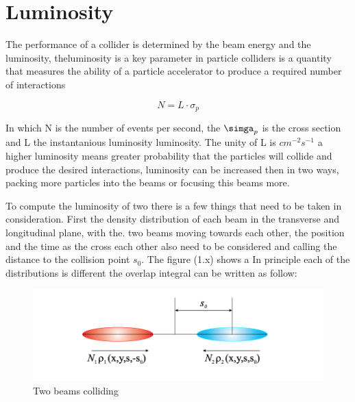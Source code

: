 

\section{Luminosity}

The performance of a collider is determined by the beam energy and the luminosity, theluminosity is a key parameter in particle colliders is a quantity that measures the ability of a particle accelerator to produce a required number of interactions\cite{Lum} 

\begin{equation}
N = L \cdot \sigma_{p} 
\end{equation}

In which N is the number of events per second, the $\simga_{p}$ is the cross section and L the instantanious luminosity luminosity. The unity of L is  $cm^{-2} s^{-1}$ a higher luminosity means greater probability that the particles will collide and produce the desired interactions, luminosity can be increased then in two ways, packing more particles into the beams or focusing this beams more.  

To compute the luminosity of two there is a few things that need to be taken in consideration. First the density distribution of each beam in the transverse and longitudinal plane, with the. two beams moving towards each other, the position and the time as the cross each other also need to be considered and calling the distance to the collision point $s_{0}$. The figure (1.x) shows a  In principle each of the distributions is different the overlap integral can be written as follow:


\begin{figure}[h]
    \centering
    \includegraphics[width=1\textwidth]{lumi.png}
    \caption{Two beams colliding}
    \label{fig:beamslumi}
\end{figure}


